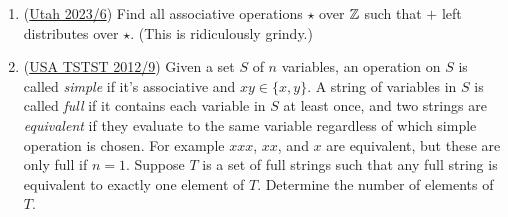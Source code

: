 \documentclass[11pt,paper=letter]{scrartcl}
\begin{document}
\begin{enumerate}
\item (\href{https://artofproblemsolving.com/community/c6h3129654p28346964}{Utah 2023/6}) Find all associative operations $\star$ over $\mathbb Z$ such that $+$ left distributes over $\star$. (This is ridiculously grindy.)
%
%
%
%
%
%

\item (\href{https://artofproblemsolving.com/community/c6h489753p2745874}{USA TSTST 2012/9}) Given a set $S$ of $n$ variables, an operation on $S$ is called \textit{simple} if it's associative and $xy \in \{x,y\}$. A string of variables in $S$ is called \textit{full} if it contains each variable in $S$ at least once, and two strings are \textit{equivalent} if they evaluate to the same variable regardless of which simple operation is chosen. For example $xxx$, $xx$, and $x$ are equivalent, but these are only full if $n=1$. Suppose $T$ is a set of full strings such that any full string is equivalent to exactly one element of $T$. Determine the number of elements of $T$.

\end{enumerate}
\end{document}

